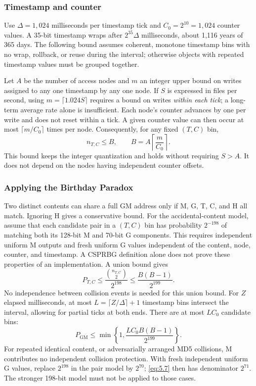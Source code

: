 \subsubsection{Timestamp and counter}\label{sec:5.4.1}

Use $\Delta=1{,}024$ milliseconds per timestamp tick and $C_0=2^{10}=1{,}024$
counter values. A 35-bit timestamp wraps after $2^{35}\Delta$ milliseconds,
about 1,116 years of 365 days. The following bound assumes coherent,
monotone timestamp bins with no wrap, rollback, or reuse during the interval;
otherwise objects with repeated timestamp values must be grouped together.

Let $A$ be the number of access nodes and $m$ an integer upper bound on
writes assigned to any one timestamp by any one node. If $S$ is expressed
in files per second, using $m=\lceil1.024S\rceil$ requires a bound on writes
\emph{within each tick}; a long-term average rate alone is insufficient.
Each node's counter advances by one per write and does not reset within
a tick. A given counter value can then occur at most $\lceil m/C_0\rceil$
times per node. Consequently, for any fixed $(T,C)$ bin,
\begin{equation}\label{eq:5.5}
n_{T,C}\le B,\qquad B=A\left\lceil\frac{m}{C_0}\right\rceil.
\end{equation}
This bound keeps the integer quantization and holds without requiring
$S>A$. It does not depend on the nodes having independent counter offsets.

\subsubsection{Applying the Birthday Paradox}\label{sec:5.4.2}

Two distinct contents can share a full GM address only if M, G, T, C, and H
all match. Ignoring H gives a conservative bound. For the accidental-content
model, assume that each candidate pair in a $(T,C)$ bin has probability
$2^{-198}$ of matching both its 128-bit M and 70-bit G components. This
requires independent uniform M outputs and fresh uniform G values independent
of the content, node, counter, and timestamp. A CSPRBG definition alone does
not prove these properties of an implementation. A union bound gives
\begin{equation}\label{eq:5.6}
P_{T,C}\le\frac{\binom{n_{T,C}}2}{2^{198}}
          \le\frac{B(B-1)}{2^{199}}.
\end{equation}
No independence between collision events is needed for this union bound.
For $Z$ elapsed milliseconds, at most
$L=\lceil Z/\Delta\rceil+1$ timestamp bins intersect the interval, allowing
for partial ticks at both ends. There are at most $LC_0$ candidate bins:
\begin{equation}\label{eq:5.7}
P_{\mathrm{GM}}\le
 \min\left\{1,\frac{LC_0B(B-1)}{2^{199}}\right\}.
\end{equation}
For repeated identical content, or adversarially arranged MD5 collisions,
M contributes no independent collision protection. With fresh independent
uniform G values, replace $2^{198}$ in the pair model by $2^{70}$;
\eqref{eq:5.7} then has denominator $2^{71}$. The stronger 198-bit model
must not be applied to those cases.

